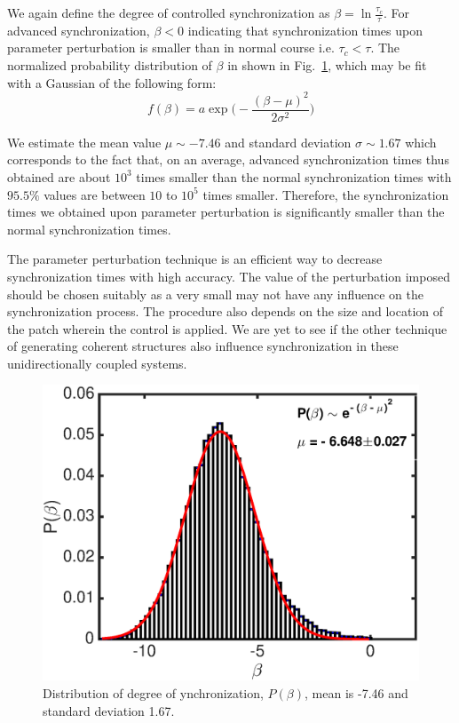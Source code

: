 \documentclass[reprint,superscriptaddress,amsmath,amssymb,aps,pre]{revtex4-1}
\begin{document}
We again define the degree of controlled synchronization as $\beta = \ln 
\frac{\tau_c}{\tau}$. For advanced synchronization, $\beta < 0$ indicating 
that synchronization times upon parameter perturbation is smaller than in 
normal course i.e. $\tau_c < \tau$. The normalized probability distribution of 
$\beta$ in shown in Fig.~\ref{fig:beta_dist}, which may be fit with a Gaussian 
of the following form:
\begin{equation}
f(\beta) =  a\exp\Big(-\frac{(\beta-\mu)^2}{2\sigma^2}\Big)
\end{equation}

We estimate the mean value $\mu \sim -7.46$ and standard deviation $\sigma 
\sim1.67$ which corresponds to the fact that, on an average, advanced 
synchronization times thus obtained are about $10^3$ times smaller than the 
normal synchronization times with $95.5\%$ values are between $10$ to $10^5$ 
times smaller.  Therefore, the synchronization times we obtained upon 
parameter perturbation is significantly smaller than the normal 
synchronization times.

The parameter perturbation technique is an efficient way to decrease synchronization times with high accuracy.  The value of the perturbation imposed should be chosen suitably as a very small may not have any influence on the synchronization process. The procedure also depends on the size and location of the patch wherein the control is applied. We are yet to see if the other technique of generating coherent structures also influence synchronization in these unidirectionally coupled systems. 
\begin{figure}[b]
    \includegraphics[scale=0.45]{Fast_strength_dist.eps}
	\caption{\label{fig:beta_dist}\footnotesize Distribution of degree of 
	ynchronization, $P(\beta)$, mean is -7.46 and standard deviation 1.67.}
\end{figure}
\end{document}
